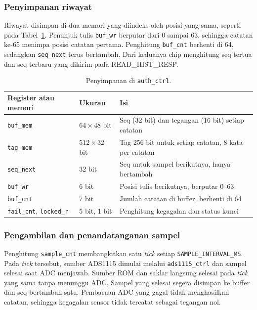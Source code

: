 \documentclass[11pt,a4paper]{article}
\begin{document}
\subsubsection*{Penyimpanan riwayat}

Riwayat disimpan di dua memori yang diindeks oleh posisi yang sama, seperti pada
Tabel~\ref{tab:memori}. Penunjuk tulis \texttt{buf\_wr} berputar dari 0 sampai 63, sehingga
catatan ke-65 menimpa posisi catatan pertama. Penghitung \texttt{buf\_cnt} berhenti di 64,
sedangkan \texttt{seq\_next} terus bertambah. Dari keduanya chip menghitung seq tertua dan seq
terbaru yang dikirim pada READ\_HIST\_RESP.

\begin{table}[H]
  \centering
  \small
  \begin{tabularx}{\textwidth}{l l X}
    \toprule
    Register atau memori & Ukuran & Isi \\
    \midrule
    \texttt{buf\_mem} & $64 \times 48$ bit & Seq (32 bit) dan tegangan (16 bit) setiap catatan \\
    \texttt{tag\_mem} & $512 \times 32$ bit & Tag 256 bit untuk setiap catatan, 8 kata per catatan \\
    \texttt{seq\_next} & 32 bit & Seq untuk sampel berikutnya, hanya bertambah \\
    \texttt{buf\_wr} & 6 bit & Posisi tulis berikutnya, berputar 0--63 \\
    \texttt{buf\_cnt} & 7 bit & Jumlah catatan di buffer, berhenti di 64 \\
    \texttt{fail\_cnt}, \texttt{locked\_r} & 5 bit, 1 bit & Penghitung kegagalan dan status
      kunci \\
    \bottomrule
  \end{tabularx}
  \caption{Penyimpanan di \texttt{auth\_ctrl}.}
  \label{tab:memori}
\end{table}

\subsubsection*{Pengambilan dan penandatanganan sampel}

Penghitung \texttt{sample\_cnt} membangkitkan satu \textit{tick} setiap
\texttt{SAMPLE\_INTERVAL\_MS}. Pada \textit{tick} tersebut, sumber ADS1115 dimulai melalui
\texttt{ads1115\_ctrl} dan sampel selesai saat ADC menjawab. Sumber ROM dan saklar langsung
selesai pada \textit{tick} yang sama tanpa menunggu ADC. Sampel yang selesai segera disimpan ke
buffer dan seq bertambah satu. Pembacaan ADC yang gagal tidak menghasilkan catatan, sehingga
kegagalan sensor tidak tercatat sebagai tegangan nol.
\end{document}
